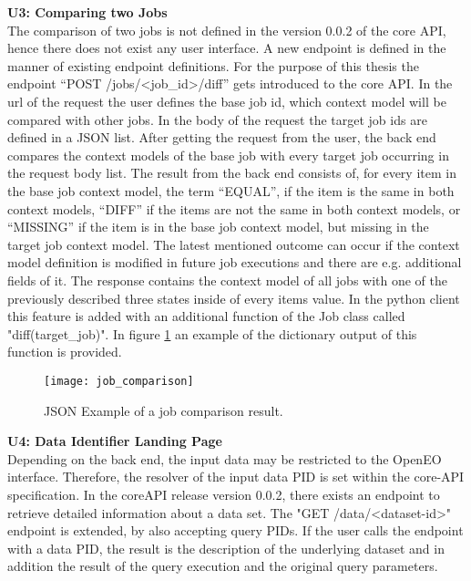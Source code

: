 \documentclass[draft,final]{vutinfth} %
\begin{document}
\textbf{U3: Comparing two Jobs} \\
The comparison of two jobs is not defined in the version 0.0.2 of the core API, hence there does not exist any user interface. A new endpoint is defined in the manner of existing endpoint definitions. For the purpose of this thesis the endpoint  “POST /jobs/<job\_id>/diff” gets introduced to the core API. In the url of the request the user defines the base job id, which context model will be compared with other jobs. In the body of the request the target job ids are defined in a JSON list. After getting the request from the user, the back end compares the context models of the base job with every target job occurring in the request body list. The result from the back end consists of, for every item in the base job context model, the term “EQUAL”, if the item is the same in both context models, “DIFF” if the items are not the same in both context models, or “MISSING” if the item is in the base job context model, but missing in the target job context model. The latest mentioned outcome can occur if the context model definition is modified in future job executions and there are e.g. additional fields of it. The response contains the context model of all jobs with one of the previously described three states inside of every items value. In the python client this feature is added with an additional function of the Job class called "diff(target\_job)". In figure \ref{fig:job_comparison} an example of the dictionary output of this function is provided.

\begin{figure}[h]
	\centering
	\texttt{[image: job\_comparison]}
	\caption{JSON Example of a job comparison result.}
	\label{fig:job_comparison} %
\end{figure}


\textbf{U4: Data Identifier Landing Page} \\
Depending on the back end, the input data may be restricted to the OpenEO interface. Therefore, the resolver of the input data PID is set within the core-API specification. In the coreAPI release version 0.0.2, there exists an endpoint to retrieve detailed information about a data set. The "GET /data/<dataset-id>" endpoint is extended, by also accepting query PIDs. If the user calls the endpoint with a data PID, the result is the description of the underlying dataset and in addition the result of the query execution and the original query parameters.
\end{document}
